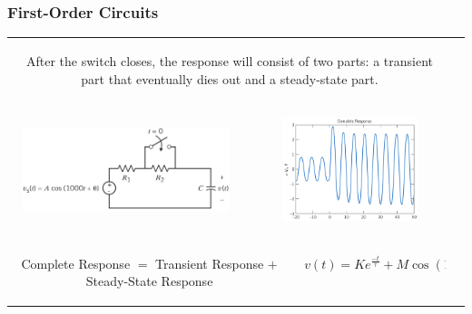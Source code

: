 \documentclass[aspectratio=169]{beamer}
\begin{document}
\begin{frame}[fragile]
	\frametitle{First-Order Circuits}
		\begin{tabular}{cc}
			\begin{columns}
				\begin{column}{1\textwidth}  %
\small					After the switch closes, the response will consist of two parts: a transient part that eventually dies out
and a steady-state part. 
				\end{column}
			\end{columns}\\
		
\begin{columns}
	\begin{column}{.5\textwidth}  %
	\center			\includegraphics[width=6cm,height=3.0cm]{figure1.png}
				
				\end{column}
		
	\begin{column}{.5\textwidth}  %
	\center			\includegraphics[width=5cm,height=3cm]{figure5.png}
		
				\end{column}				
		\end{columns}\\
		
\begin{columns}
	\begin{column}{.5\textwidth}  %
\center \small					Complete  Response $=$ Transient Response $+$ Steady-State  Response
		
				\end{column}
		
	\begin{column}{.5\textwidth}  %
\center \small					$v(t)=Ke^{\frac{-t}{\tau}}+M \cos(1000t+\delta)$
		
				\end{column}		
		
		
		
		\end{columns}\\		
		
		
		
		
	\end{tabular}	
	
	
	
	
	
	
\end{frame}
\end{document}
